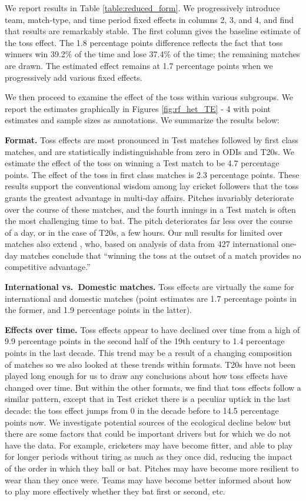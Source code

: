 \documentclass[11pt,  letterpaper]{article}
\begin{document}
We report results in Table \ref{table:reduced_form}. We progressively introduce team, match-type, and time period fixed effects in columns 2, 3, and 4, and find that results are remarkably stable. The first column gives the baseline estimate of the toss effect. The 1.8 percentage points difference reflects the fact that toss winners win 39.2\% of the time and lose 37.4\% of the time; the remaining matches are drawn. The estimated effect remains at 1.7 percentage points when we progressively add various fixed effects.

We then proceed to examine the effect of the toss within various subgroups. We report the estimates graphically in Figures \ref{fig:rf_het_TE} - 4 with point estimates and sample sizes as annotations. We summarize the results below:

\textbf{Format.} Toss effects are most pronounced in Test matches followed by first class matches, and are statistically indistinguishable from zero in ODIs and T20s. We estimate the effect of the toss on winning a Test match to be 4.7 percentage points. The effect of the toss in first class matches is 2.3 percentage points. These results support the conventional wisdom among lay cricket followers that the toss grants the greatest advantage in multi-day affairs. Pitches invariably deteriorate over the course of these matches, and the fourth innings in a Test match is often the most challenging time to bat. The pitch deteriorates far less over the course of a day, or in the case of T20s, a few hours. Our null results for limited over matches also extend \citet{de1998winning}, who, based on analysis of data from 427 international one-day matches conclude that ``winning the toss at the outset of a match provides no competitive advantage.''

\textbf{International vs.~Domestic matches.} Toss effects are virtually the same for international and domestic matches (point estimates are 1.7 percentage points in the former, and 1.9 percentage points in the latter). 

\textbf{Effects over time.} Toss effects appear to have declined over time from a high of 9.9 percentage points in the second half of the 19th century to 1.4 percentage points in the last decade. This trend may be a result of a changing composition of matches so we also looked at these trends within formats. T20s have not been played long enough for us to draw any conclusions about how toss effects have changed over time. But within the other formats, we find that toss effects follow a similar pattern, except that in Test cricket there is a peculiar uptick in the last decade: the toss effect jumps from 0 in the decade before to 14.5 percentage points now. We investigate potential sources of the ecological decline below but there are some factors that could be important drivers but for which we do not have the data. For example, cricketers may have become fitter, and able to play for longer periods without tiring as much as they once did, reducing the impact of the order in which they ball or bat. Pitches may have become more resilient to wear than they once were. Teams may have become better informed about how to play more effectively whether they bat first or second, etc. 
\end{document}
